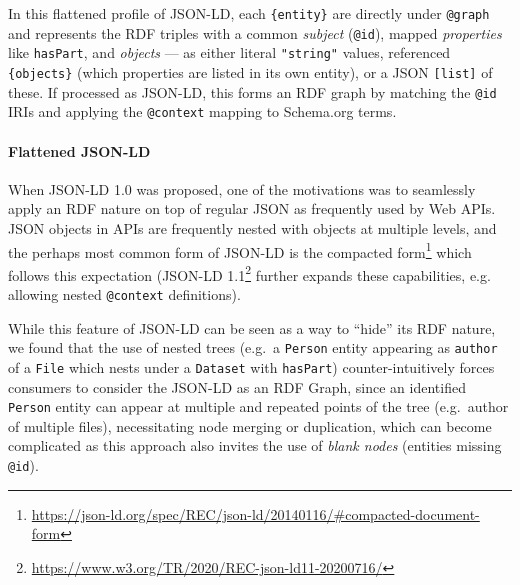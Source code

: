  

In this flattened profile of JSON-LD, each \texttt{\{entity\}} are
directly under \texttt{@graph} and represents the RDF triples with a
common \emph{subject} (\texttt{@id}), mapped \emph{properties} like
\texttt{hasPart}, and \emph{objects} --- as either literal
\texttt{"string"} values, referenced \texttt{\{objects\}} (which
properties are listed in its own entity), or a JSON \texttt{{[}list{]}}
of these. If processed as JSON-LD, this forms an RDF graph by matching
the \texttt{@id} IRIs and applying the \texttt{@context} mapping to
Schema.org terms. \normalsize

\paragraph{Flattened JSON-LD}\label{ch5:flattened-json-ld}

When JSON-LD 1.0 \cite{w3-ldp}
was
proposed, one of the motivations was to seamlessly apply an RDF nature
on top of regular JSON as frequently used by Web APIs. JSON objects in
APIs are frequently nested with objects at multiple levels, and the
perhaps most common form of JSON-LD is the compacted
form\footnote{\url{https://json-ld.org/spec/REC/json-ld/20140116/\#compacted-document-form}}
which follows this expectation (JSON-LD
1.1\footnote{\url{https://www.w3.org/TR/2020/REC-json-ld11-20200716/}} further
expands these capabilities, e.g. allowing nested \texttt{@context} definitions).


While this feature of JSON-LD can be seen as a way to ``hide'' its RDF
nature, we found that the use of nested trees (e.g.~a \texttt{Person}
entity appearing as \texttt{author} of a \texttt{File} which nests under
a \texttt{Dataset} with \texttt{hasPart}) counter-intuitively forces
consumers to consider the JSON-LD as an RDF Graph, since an identified
\texttt{Person} entity can appear at multiple and repeated points of the
tree (e.g.~author of multiple files), necessitating node merging or
duplication, which can become complicated as this approach also invites
the use of \emph{blank nodes} (entities missing \texttt{@id}).

